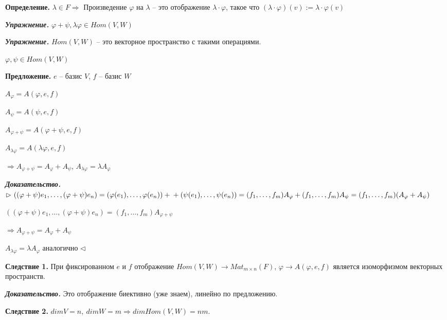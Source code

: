 \bigskip
\textbf{Определение.} $\lambda \in F \Rightarrow$ Произведение  $\varphi$ на $\lambda$ -- это отображение $\lambda \cdot \varphi$, такое что $(\lambda \cdot \varphi) (v) := \lambda \cdot \varphi (v)$

\bigskip
\textbf{\textit{Упражнение.}} $\varphi + \psi, \lambda \varphi \in Hom(V, W)$

\bigskip
\textbf{\textit{Упражнение.}} $Hom(V, W)$ -- это векторное пространство с такими операциями.

\bigskip
$\varphi, \psi \in Hom(V, W)$

\textbf{Предложение.} $e$ -- базис $V$, $f$ -- базис $W$

$A_{\varphi} = A(\varphi, e, f)$

$A_{\psi} = A(\psi, e, f)$

$A_{\varphi + \psi} = A(\varphi + \psi, e, f)$

$A_{\lambda \varphi} = A(\lambda \varphi, e, f)$

$\Rightarrow A_{\varphi + \psi} = A_{\varphi} + A_{\psi}$, $A_{\lambda \varphi} = \lambda A_{\varphi}$

\bigskip
\textbf{\textit{Доказательство.}} $\rhd \ ((\varphi + \psi)e_1, \dots, (\varphi + \psi)e_n) = (\varphi (e_1), \dots, \varphi (e_n)) + \\ + (\psi (e_1), \dots, \psi (e_n)) = (f_1, \dots, f_m) A_{\varphi} + (f_1, \dots, f_m) A_{\psi} = (f_1, \dots, f_m) (A_{\varphi} + A_{\psi}) $ 

$((\varphi + \psi)e_1, \dots, (\varphi + \psi)e_n) = (f_1, \dots, f_m) A_{\varphi + \psi}$

$\Rightarrow A_{\varphi + \psi} = A_{\varphi} + A_{\psi}$

$A_{\lambda \varphi} = \lambda A_{\varphi}$ аналогично $\lhd$

\bigskip
\textbf{Следствие 1.} При фиксированном $e$ и $f$ отображение $Hom(V, W) \rightarrow Mat_{m \times n} (F)$, $\varphi \rightarrow A(\varphi, e, f)$ является изоморфизмом векторных пространств.

\bigskip
\textbf{\textit{Доказательство.}} Это отображение биективно (уже знаем), линейно по предложению.

\bigskip
\textbf{Следствие 2.} $dimV = n, \ dimW = m \Rightarrow dim Hom(V, W) = nm$.

